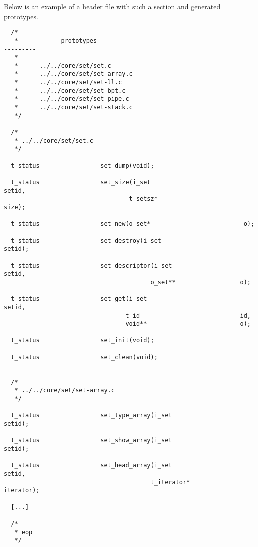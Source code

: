 Below is an example of a header file with such a 
section and generated prototypes.

\begin{verbatim}
  /*
   * ---------- prototypes ----------------------------------------------------
   *
   *      ../../core/set/set.c
   *      ../../core/set/set-array.c
   *      ../../core/set/set-ll.c
   *      ../../core/set/set-bpt.c
   *      ../../core/set/set-pipe.c
   *      ../../core/set/set-stack.c
   */

  /*
   * ../../core/set/set.c
   */

  t_status                 set_dump(void);

  t_status                 set_size(i_set                          setid,
                                   t_setsz*                       size);

  t_status                 set_new(o_set*                          o);

  t_status                 set_destroy(i_set                       setid);

  t_status                 set_descriptor(i_set                    setid,
                                         o_set**                  o);

  t_status                 set_get(i_set                           setid,
                                  t_id                            id,
                                  void**                          o);

  t_status                 set_init(void);

  t_status                 set_clean(void);


  /*
   * ../../core/set/set-array.c
   */

  t_status                 set_type_array(i_set                    setid);

  t_status                 set_show_array(i_set                    setid);

  t_status                 set_head_array(i_set                    setid,
                                         t_iterator*              iterator);

  [...]

  /*
   * eop
   */
\end{verbatim}
